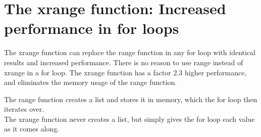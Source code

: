 \documentclass[12p,a4paper]{article}
\begin{document}
\section*{The xrange function: Increased performance in for loops}
The xrange function can replace the range function in any for loop with identical results and increased performance. There is no reason to use range instead of xrange in a for loop. The xrange function has a factor 2.3 higher performance, and eliminates the memory usage of the range function.

The range function creates a list and stores it in memory, which the for loop then iterates over.\\
The xrange function never creates a list, but simply gives the for loop each value as it comes along.
\end{document}

